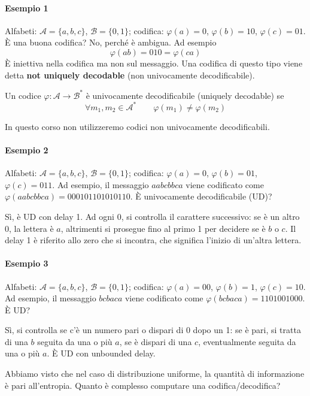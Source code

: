 \paragraph{Esempio 1} Alfabeti: $\mathcal{A}=\{a,b,c\}$, $\mathcal{B}=\{0,1\}$; codifica: $\varphi(a)=0$, $\varphi(b)=10$, $\varphi(c)=01$. È una buona codifica? No, perché è ambigua. Ad esempio
$$
    \varphi(ab) = 010 = \varphi(ca)
$$
È iniettiva nella codifica ma non sul messaggio. Una codifica di questo tipo viene detta \textbf{not uniquely decodable} (non univocamente decodificabile).

\begin{definition}
    Un codice $\varphi:\mathcal{A}\to\mathcal{B}^*$ è univocamente decodificabile (uniquely decodable) se
    $$
        \forall m_1,m_2\in\mathcal{A}^* \qquad \varphi(m_1)\neq\varphi(m_2)
    $$
\end{definition}
In questo corso non utilizzeremo codici non univocamente decodificabili.

\paragraph{Esempio 2} Alfabeti: $\mathcal{A}=\{a,b,c\}$, $\mathcal{B}=\{0,1\}$; codifica: $\varphi(a)=0$, $\varphi(b)=01$, $\varphi(c)=011$. Ad esempio, il messaggio $aabcbbca$ viene codificato come $\varphi(aabcbbca)=000101101010110$. È univocamente decodificabile (UD)?

Sì, è UD con delay 1. Ad ogni 0, si controlla il carattere successivo: se è un altro 0, la lettera è $a$, altrimenti si prosegue fino al primo 1 per decidere se è $b$ o $c$. Il delay 1 è riferito allo zero che si incontra, che significa l'inizio di un'altra lettera.

\paragraph{Esempio 3} Alfabeti: $\mathcal{A}=\{a,b,c\}$, $\mathcal{B}=\{0,1\}$; codifica: $\varphi(a)=00$, $\varphi(b)=1$, $\varphi(c)=10$. Ad esempio, il messaggio $bcbaca$ viene codificato come $\varphi(bcbaca)=1101001000$. È UD? 

Sì, si controlla se c'è un numero pari o dispari di 0 dopo un 1: se è pari, si tratta di una $b$ seguita da una o più $a$, se è dispari di una $c$, eventualmente seguita da una o più $a$. È UD con unbounded delay.\bigskip 

Abbiamo visto che nel caso di distribuzione uniforme, la quantità di informazione è pari all'entropia. Quanto è complesso computare una codifica/decodifica?

